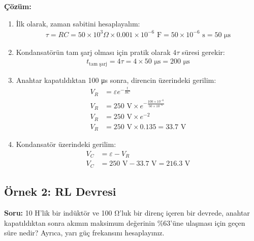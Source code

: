 \documentclass[11pt,letterpaper,twocolumn]{fenbil}
\begin{document}
\textbf{Çözüm:}
\begin{enumerate}
\item İlk olarak, zaman sabitini hesaplayalım:
\begin{align}
\tau = RC = 50 \times 10^3 \Omega \times 0.001 \times 10^{-6} \text{ F} = 50 \times 10^{-6} \text{ s} = 50 \text{ μs}
\end{align}

\item Kondansatörün tam şarj olması için pratik olarak $4\tau$ süresi gerekir:
\begin{align}
t_{\text{tam şarj}} = 4\tau = 4 \times 50 \text{ μs} = 200 \text{ μs}
\end{align}

\item Anahtar kapatıldıktan 100 μs sonra, direncin üzerindeki gerilim:
\begin{align}
V_R &= \varepsilon e^{-\frac{t}{RC}}\\
V_R &= 250 \text{ V} \times e^{-\frac{100 \times 10^{-6}}{50 \times 10^{-6}}}\\
V_R &= 250 \text{ V} \times e^{-2}\\
V_R &= 250 \text{ V} \times 0.135 = 33.7 \text{ V}
\end{align}

\item Kondansatör üzerindeki gerilim:
\begin{align}
V_C &= \varepsilon - V_R\\
V_C &= 250 \text{ V} - 33.7 \text{ V} = 216.3 \text{ V}
\end{align}
\end{enumerate}

\subsection{Örnek 2: RL Devresi}

\begin{tcolorbox}
\textbf{Soru:} 10 H'lik bir indüktör ve 100 Ω'luk bir direnç içeren bir devrede, anahtar kapatıldıktan sonra akımın maksimum değerinin \%63'üne ulaşması için geçen süre nedir? Ayrıca, yarı güç frekansını hesaplayınız.
\end{tcolorbox}
\end{document}
